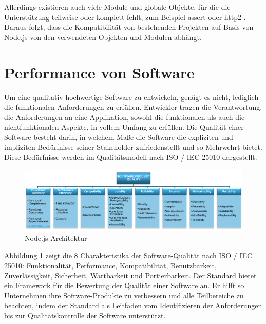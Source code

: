 \noindent
Allerdings existieren auch viele Module und globale Objekte, für die die Unterstützung teilweise oder komplett fehlt, zum Beispiel assert oder http2 \cite{Bun.}. Daraus folgt, dass die Kompatibilität von bestehenden Projekten auf Basis von Node.js von den verwendeten Objekten und Modulen abhängt.

\section{Performance von Software} \label{sec:Performance}
Um eine qualitativ hochwertige Software zu entwickeln, genügt es nicht, lediglich die funktionalen Anforderungen zu erfüllen. Entwickler tragen die Verantwortung, die Anforderungen an eine Applikation, sowohl die funktionalen als auch die nichtfunktionalen Aspekte, in vollem Umfang zu erfüllen. Die Qualität einer Software besteht darin, in welchem Maße die Software die expliziten und impliziten Bedürfnisse seiner Stakeholder zufriedenstellt und so Mehrwehrt bietet. Diese Bedürfnisse werden im Qualitätsmodell nach ISO / IEC 25010 dargestellt. \cite{.2022}\\

\begin{figure}[h]
	\centering
	\includegraphics[width=\linewidth]{./images/iso25010.png}
	\caption[Node.js Architektur]{Node.js Architektur \cite{.2022}}
	\label{fig:softwareQuality}
\end{figure}

Abbildung \ref{fig:softwareQuality} zeigt die 8 Charakteristika der Software-Qualität nach ISO / IEC 25010: Funktionalität, Performance, Kompatibilität, Benutzbarkeit, Zuverlässigkeit, Sicherheit, Wartbarkeit und Portierbarkeit. Der Standard bietet ein Framework für die Bewertung der Qualität einer Software an. Er hilft so Unternehmen ihre Software-Produkte zu verbessern und alle Teilbereiche zu beachten, indem der Standard als Leitfaden vom Identifizieren der Anforderungen bis zur Qualitätskontrolle der Software unterstützt. \cite{ISOIEC.}\\

